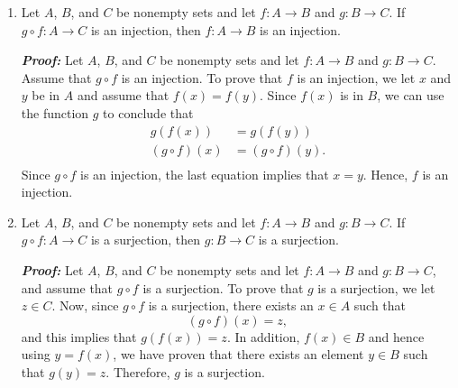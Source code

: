 \documentclass[11pt]{article}
\begin{document}
\begin{enumerate}
\item Let  $A$, $B$, and  $C$  be nonempty sets and let  $f:A \to B$  and  $g:B \to C$.  If  
$g \circ f:A \to C$  is an injection, then  $f:A \to B$  is an injection.

\textbf{\emph{Proof:}}  Let  $A$, $B$, and  $C$  be nonempty sets and let  $f:A \to B$  and  
$g:B \to C$.  Assume that $g \circ f$ is an injection.  To prove that $f$ is an injection, we let $x$ and $y$ be in $A$ and assume that $f \left( x \right) = f \left( y \right)$.  Since $f \left( x \right)$ is in $B$, we can use the function $g$ to conclude that
\[
\begin{aligned}
g \left( f \left( x \right) \right) &= g \left( f \left( y \right) \right) \\
\left( g \circ f \right) \left( x \right) &= \left( g \circ f \right) \left( y \right). \\
\end{aligned}
\]
Since $g \circ f$ is an injection, the last equation implies that $x = y$. Hence, $f$ is an injection.

\item Let  $A$, $B$, and  $C$  be nonempty sets and let  $f:A \to B$  and  $g:B \to C$.  If  
$g \circ f:A \to C$  is a surjection, then  $g:B \to C$  is a surjection.

\textbf{\emph{Proof:}}  Let  $A$, $B$, and  $C$  be nonempty sets and let  $f:A \to B$  and  
$g:B \to C$, and assume that $g \circ f$ is a surjection.  To prove that $g$ is a surjection, we let $z \in C$.  Now, since $g \circ f$ is a surjection, there exists an $x \in A$ such that
\[
\left( g \circ f \right) \left( x \right) = z,
\]
and this implies that $g \left( f \left( x \right) \right) = z$.  In addition, 
$f \left( x \right) \in B$ and hence using $y = f \left( x \right)$, we have proven that there exists an element $y \in B$ such that $g \left( y \right) = z$.  Therefore, $g$ is a surjection.
\end{enumerate}
\end{document}
